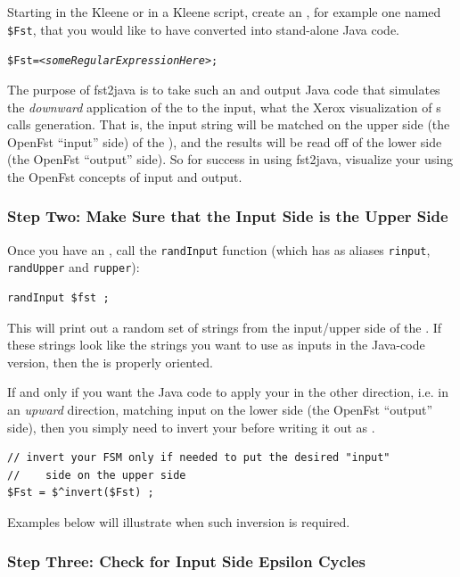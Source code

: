 Starting in the Kleene  or in a Kleene script, create an \fsm{}, for example one
named \verb!$Fst!, that you would like to have converted into stand-alone Java code.  

\begin{alltt}
\$Fst =  \emph{<someRegularExpressionHere>} ;
\end{alltt}

The purpose of
fst2java is to take such an \fsm{} and output Java code that simulates the \emph{downward}
application of the \fsm{} to the input, what the Xerox visualization of \fsm{}s calls generation.
That is, the input string will be
matched on the upper side (the OpenFst ``input'' side) of the \fsm{}), and the
results will be read off of the lower side (the OpenFst ``output'' side).
So for success in using fst2java, visualize your \fsm{} using the OpenFst concepts of
input and output.

\subsubsection{Step Two: Make Sure that the Input Side is the Upper Side}

Once you have an \fsm{}, call the \texttt{randInput} function (which has as aliases \texttt{rinput},
\texttt{randUpper} and \texttt{rupper}):

\begin{Verbatim}
randInput $fst ;
\end{Verbatim}

\noindent
This will print out a random set of strings from the input/upper side of the \fsm{}.  If these strings
look like the strings you want to use as inputs in the Java-code version, then the \fsm{} is
properly oriented.

If and only if you want the Java code to apply your \fsm{} in the other direction, i.e.
in an \emph{upward} direction, matching input on the lower side (the OpenFst
``output'' side), then you simply need to invert your \fsm{} before writing it out as \xml{}.

\begin{Verbatim}
// invert your FSM only if needed to put the desired "input"
//    side on the upper side
$Fst = $^invert($Fst) ;
\end{Verbatim}

\noindent
Examples below will illustrate when such inversion is required.

\subsubsection{Step Three: Check for Input Side Epsilon Cycles}

